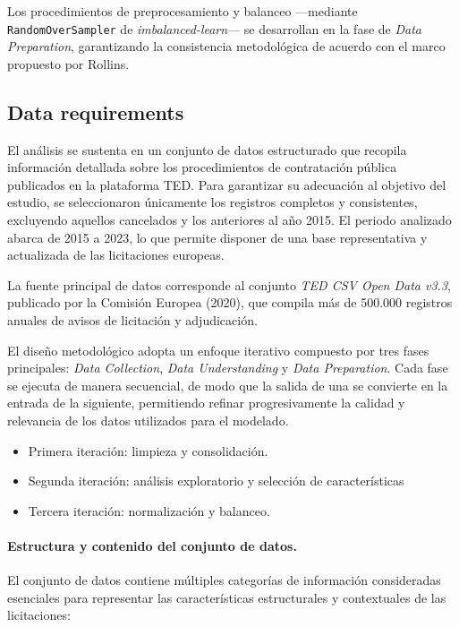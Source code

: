 \documentclass[a4paper,fleqn]{cas-sc}
\begin{document}
	Los procedimientos de preprocesamiento y balanceo ---mediante \texttt{RandomOverSampler} de \textit{imbalanced-learn}--- se desarrollan en la fase de \textit{Data Preparation}, garantizando la consistencia metodológica de acuerdo con el marco propuesto por Rollins.

  \subsection{Data requirements}\label{sec:fase3}
 

El análisis se sustenta en un conjunto de datos estructurado que recopila información detallada sobre los procedimientos de contratación pública publicados en la plataforma TED. 
Para garantizar su adecuación al objetivo del estudio, se seleccionaron únicamente los registros completos y consistentes, excluyendo aquellos cancelados y los anteriores al año 2015. 
El periodo analizado abarca de 2015 a 2023, lo que permite disponer de una base representativa y actualizada de las licitaciones europeas. 

	La fuente principal de datos corresponde al conjunto \textit{TED CSV Open Data v3.3}, publicado por la Comisión Europea (2020), que compila más de 500.000 registros anuales de avisos de licitación y adjudicación.


El diseño metodológico adopta un enfoque iterativo compuesto por tres fases principales: \textit{Data Collection}, \textit{Data Understanding} y \textit{Data Preparation}. 
Cada fase se ejecuta de manera secuencial, de modo que la salida de una se convierte en la entrada de la siguiente, permitiendo refinar progresivamente la calidad y relevancia de los datos utilizados para el modelado.


\begin{itemize}
	\item Primera iteración: limpieza y consolidación.
	\item Segunda iteración: análisis exploratorio y selección de características
	\item Tercera iteración: normalización y balanceo.
\end{itemize}

\paragraph{Estructura y contenido del conjunto de datos.} 

El conjunto de datos contiene múltiples categorías de información consideradas esenciales para representar las características estructurales y contextuales de las licitaciones:
\end{document}
